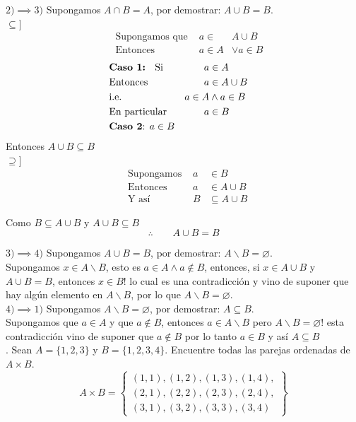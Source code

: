 \documentclass[letterpaper]{article}
\renewcommand{\*}{\cdot}
\theoremstyle{definition}
\begin{document}
$ 2) \implies 3) $ Supongamos $ A \cap B = A $, por demostrar: $ A \cup B = B $.\\
$\subseteq]  $
\begin{align*}
	& \text{ Supongamos que  } &  a \in& A \cup B \\
	& \text{ Entonces  } &  a \in A &\lor  a \in B
\end{align*}
\begin{align*}
	& \text{\textbf{Caso 1: } Si  } &  a &\in A & \\
	& \text{Entonces } &  a &\in A \cup B \\
	& \text{i.e. } &  a \in A &\land a \in B \\
	& \text{En particular } &  a &\in B\\
	& \text{\textbf{Caso 2}: } a \in B
\end{align*}
Entonces $ A\cup B \subseteq B $\\
$ \supseteq] $
\begin{align*}
	& \text{Supongamos  } &  a &\in B \\
	& \text{Entonces  } &  a &\in A \cup B \\
	& \text{Y así  } &  B &\subseteq A \cup B 
\end{align*}
\begin{center}
	Como $  B \subseteq A \cup B $ y $ A\cup B \subseteq B  $
	\[ \therefore \qquad A\cup B = B \]
\end{center}
$ 3) \implies 4) $ Supongamos $ A \cup B = B $, por demostrar: $ A \backslash B = \varnothing  $.\\
Supongamos $ x \in A \backslash B $, esto es $ a \in A \land a \notin B $, entonces, si $ x \in A \cup B $ y $ A \cup B = B $, entonces
$ x \in B $! lo cual es una contradicción y vino de suponer que hay algún elemento en $ A \backslash B $, por lo que $ A \backslash B = \varnothing $.\\


\noindent$ 4) \implies 1) $ Supongamos $ A \backslash B = \varnothing  $, por demostrar: $ A \subseteq B $.\\
Supongamos que $ a \in A $ y que $ a \notin B $, entonces $ a \in A\backslash B $ pero $ A \backslash B =  \varnothing$! esta contradicción vino de suponer que $ a \notin B $ por lo tanto $ a \in B $ y así $ A \subseteq B $\\


. Sean $ A = \{ 1,2,3 \} $ y $ B =\{ 1,2,3,4 \} $. Encuentre todas las parejas ordenadas de $ A \times B $.\\
\[ A \times B = \left\lbrace 
\begin{array}{c}
 (1,1), (1,2), (1,3), (1,4),\\
(2,1), (2,2), (2,3), (2,4),\\
(3,1), (3,2), (3,3), (3,4) 
\end{array}
\right\rbrace \]
\end{document}
